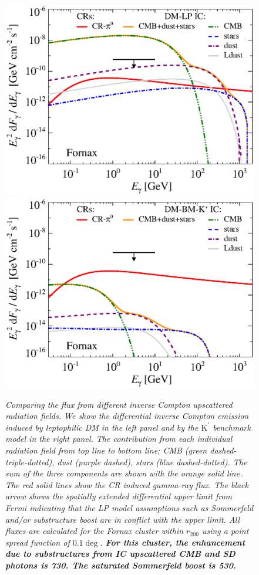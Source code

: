 \documentclass[10pt,aps,pra,reprint,amsmath,amsfonts,amssymb,showpacs,nofootinbib,floatfix]{revtex4-1}
\def\del#1{{}}
\def\C#1{{\bf #1}}
\newcommand{\Fermi}{{\em Fermi}\xspace}
\newcommand{\rmn}{\mathrm}
\newcommand{\Kp}{\rmn{K}^\prime}
\newcommand{\rvir}{r_{200}}
\begin{document}
\begin{figure}
\begin{minipage}{2.0\columnwidth}
\includegraphics[width=0.49\columnwidth]{figures/flux.IRcomp.v13.0.1deg.1.6T.SubMass.elmu.SF700.noMW.woGal.eps}
\includegraphics[width=0.49\columnwidth]{figures/flux.IRcomp.BMv13.0.1deg.SubMass.noMW.woGal.eps}
\caption{\it Comparing the flux from different inverse Compton
  upscattered radiation fields. We show the differential inverse
  Compton emission induced by leptophilic DM in the left panel and by
  the $\Kp$ benchmark model in the right panel. The contribution from
  each individual radiation field from top line to bottom line; CMB
  (green dashed-triple-dotted), dust (purple dashed), stars (blue
  dashed-dotted). The sum of the three components are shown with the
  orange solid line. The red solid lines show the CR induced gamma-ray
  flux. The black arrow shows the spatially extended differential
  upper limit from \Fermi \protect \cite{2010ApJ...717L..71A}
  indicating that the LP model assumptions such as Sommerfeld and/or
  substructure boost are in conflict with the upper limit. \del{We
    also show projected CTA point source sensitivities ($5\sigma$,
    50h).}  All fluxes are calculated for the Fornax cluster within
  $\rvir$ using a point spread function of $0.1\deg$. \C{For this
    cluster, the enhancement due to substructures from IC upscattered
    CMB and SD photons is 730. The saturated Sommerfeld boost is 530.}}
 \label{fig:IR_comp}
\end{minipage}
\end{figure}
\end{document}
